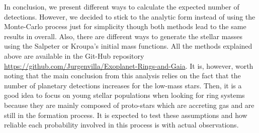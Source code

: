 In conclusion, we present different ways to calculate the expected number of detections. However, we decided to stick to the analytic form instead of using the Monte-Carlo process just for simplicity though both methods lead to the same results in overall. Also, there are different ways to generate the stellar masses using the Salpeter or Kroupa's initial mass functions. All the methods explained above are available in the Git-Hub repository \url{https://github.com/Jurgenvilla/Exoplanet-Rings-and-Gaia}. It is, however, worth noting that the main conclusion from this analysis relies on the fact that the number of planetary detections increases for the low-mass stars. Then, it is a good idea to focus on young stellar populations when looking for ring systems because they are mainly composed of proto-stars which are accreting gas and are still in the formation process. It is expected to test these assumptions and how reliable each probability involved in this process is with actual observations. 
